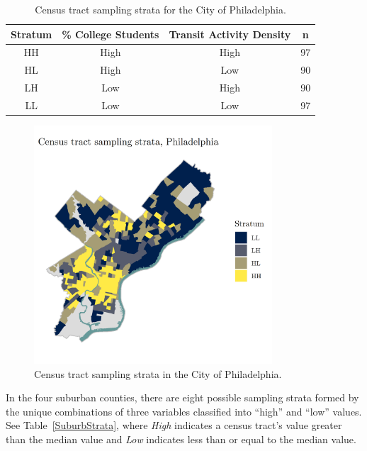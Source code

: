 \documentclass[paper=letterpaper, fontsize=11pt]{scrartcl}
\begin{document}
\begin{table}
	\renewcommand*{\arraystretch}{1.4}
	\centering 
	\caption{Census tract sampling strata for the City of Philadelphia.} 
	\label{PhilaStrata} 
	\begin{tabular}{|c c c c|} 
		\hline 
		\textbf{Stratum} & \textbf{\% College Students} & \textbf{Transit Activity Density} & \textbf{n} \\
		\hline
		HH & High & High & 97 \\
		\hline
		HL & High & Low & 90 \\
		\hline
		LH & Low & High & 90 \\
		\hline
		LL & Low & Low & 97 \\
		\hline
	\end{tabular} 
\end{table}

\begin{figure}[!htbp]
	\centering
	\includegraphics[width = 3.5in]{phila-areal.png}
	\caption{Census tract sampling strata in the City of Philadelphia.} \label{phila-areal}
\end{figure}

In the four suburban counties, there are eight possible sampling strata formed by the unique combinations of three variables classified into ``high'' and ``low'' values. See Table~\ref{SuburbStrata}, where \textit{High} indicates a census tract's value greater than the median value and \textit{Low} indicates less than or equal to the median value.
\end{document}
